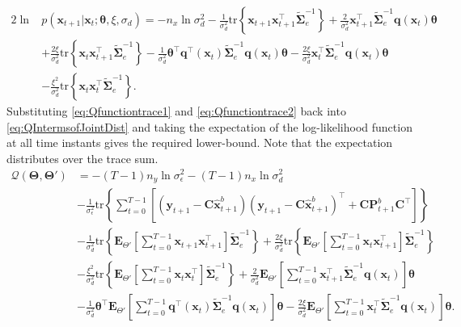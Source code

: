 \documentclass[]{article}
\begin{document}
\begin{align}
 2 \ln &p(\mathbf x_{t+1}|\mathbf x_{t};\boldsymbol \theta, \xi, \sigma_d) =-n_x\ln\sigma_d^2-\frac{1}{\sigma_d^2}\mathrm{tr}\left\lbrace\mathbf x_{t+1} \mathbf x_{t+1}^\top\tilde{\boldsymbol\Sigma}_e^{-1}\right\rbrace+\frac{2}{\sigma_d^2}\mathbf x_{t+1}^\top\tilde{\boldsymbol\Sigma}_e^{-1}\mathbf q( \mathbf x_t)\boldsymbol\theta \nonumber \\
&+\frac{2\xi}{\sigma_d^2} \mathrm{tr} \left\lbrace \mathbf x_t\mathbf x_{t+1}^\top\tilde{\boldsymbol\Sigma}_e^{-1}\right\rbrace -\frac{1}{\sigma_d^2}\boldsymbol\theta^\top \mathbf q^\top(\mathbf x_t)\tilde{\boldsymbol\Sigma}_e^{-1}\mathbf q(\mathbf x_t)\boldsymbol\theta-\frac{2\xi}{\sigma_d^2} \mathbf x_t^\top\tilde{\boldsymbol\Sigma}_e^{-1}\mathbf q(\mathbf x_t)\boldsymbol\theta \nonumber \\
&-\frac{\xi^2}{\sigma_d^2}\mathrm{tr}\left\lbrace \mathbf x_t \mathbf x_t^\top\tilde{\boldsymbol\Sigma}_e^{-1}\right\rbrace. \label{eq:Qfunctiontrace2}
\end{align}
Substituting  \eqref{eq:Qfunctiontrace1} and \eqref{eq:Qfunctiontrace2} back into \eqref{eq:QIntermsofJointDist} and taking the expectation of the log-likelihood function at all time instants gives the required lower-bound. Note that the expectation distributes over the trace sum. 
\begin{align}\label{eq:Voldermont}
 \mathcal Q(\boldsymbol \Theta,\boldsymbol\Theta')&=-(T-1)n_y\ln \sigma_{\epsilon}^2-(T-1)n_x\ln\sigma_d^2\nonumber \\
& -\frac{1}{\sigma_{\epsilon}^2}\mathrm{tr}\left\lbrace\boldsymbol\sum_{t=0}^{T-1}\left[ (\mathbf y_{t+1}-\mathbf C\mathbf{\hat{x}}_{t+1}^b) (\mathbf y_{t+1}-\mathbf C\mathbf{\hat{x}}_{t+1}^b)^\top+\mathbf C \mathbf P_{t+1}^b\mathbf C^\top\right] \right\rbrace\nonumber \\
&-\frac{1}{\sigma_d^2}\mathrm{tr}\left\lbrace \mathbf E_{\Theta'}\left[\sum_{t=0}^{T-1}\mathbf x_{t+1}\mathbf x_{t+1}^\top\right]\tilde{\boldsymbol\Sigma}_e^{-1}\right\rbrace+\frac{2\xi}{\sigma_d^2} \mathrm{tr}\left\lbrace \mathbf E_{\Theta'}\left[\sum_{t=0}^{T-1}\mathbf x_t\mathbf x_{t+1}^\top\right] \tilde{\boldsymbol\Sigma}_e^{-1}\right\rbrace \nonumber \\
&-\frac{\xi^2}{\sigma_d^2}\mathrm{tr} \left\lbrace\mathbf E_{\Theta'}\left[\sum_{t=0}^{T-1}\mathbf x_t\mathbf x_{t}^\top\right]\tilde{\boldsymbol\Sigma}_e^{-1} \right\rbrace +\frac{2}{\sigma_d^2}\mathbf E_{\Theta'}\left[\sum_{t=0}^{T-1}\mathbf x_{t+1}^\top\tilde{\boldsymbol\Sigma}_e^{-1}\mathbf q( \mathbf x_t)\right]\boldsymbol\theta
 \nonumber \\
&-\frac{1}{\sigma_d^2}\boldsymbol\theta^\top \mathbf E_{\Theta'}\left[\sum_{t=0}^{T-1}  \mathbf q^\top(\mathbf  x_t)\tilde{\boldsymbol\Sigma}_e^{-1}\mathbf q(\mathbf x_t)\right]\boldsymbol\theta-\frac{2\xi}{\sigma_d^2} \mathbf E_{\Theta'}\left[\sum_{t=0}^{T-1} \mathbf x_t^\top\tilde{\boldsymbol\Sigma}_e^{-1}\mathbf q(\mathbf x_t)  \right] \boldsymbol\theta.
\end{align}
\end{document}
